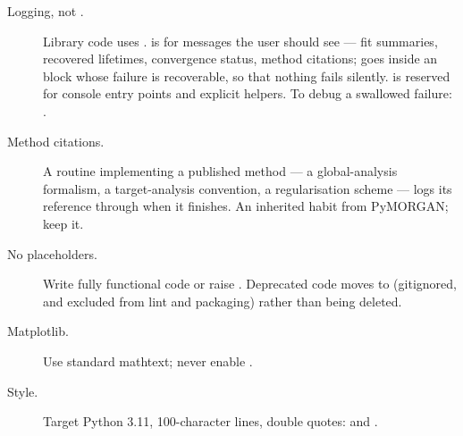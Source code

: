 \begin{description}
  \item[Logging, not .] Library code uses
    .  is for
    messages the user should see --- fit summaries, recovered lifetimes,
    convergence status, method citations;  goes inside an  block whose failure is
    recoverable, so that nothing fails silently.  is reserved for
    console entry points and explicit  helpers. To debug a
    swallowed failure:
    .
  \item[Method citations.] A routine implementing a published method --- a
    global-analysis formalism, a target-analysis convention, a regularisation
    scheme --- logs its reference through  when it finishes.
    An inherited habit from PyMORGAN; keep it.
  \item[No placeholders.] Write fully functional code or raise
    . Deprecated code moves to 
    (gitignored, and excluded from lint and packaging) rather than being
    deleted.
  \item[Matplotlib.] Use standard mathtext; never enable
    .
  \item[Style.] Target Python 3.11, 100-character lines, double quotes:
     and
    .
\end{description}
